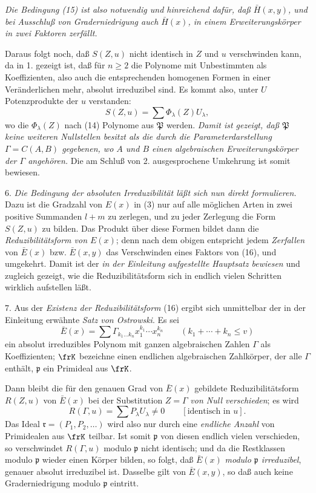 \emph{Die Bedingung (15) ist also notwendig und hinreichend dafür, daß $\bar H(x,y)$, und bei Ausschluß von Graderniedrigung auch $\bar H(x)$, in einem Erweiterungskörper in zwei Faktoren zerfällt.}

Daraus folgt noch, daß $S(Z,u)$ nicht identisch in $Z$ und $u$ verschwinden kann, da in 1. gezeigt ist, daß für $n\ge2$ die Polynome mit Unbestimmten als Koeffizienten, also auch die entsprechenden homogenen Formen in einer Veränderlichen mehr, absolut irreduzibel sind. Es kommt also, unter $U$ Potenzprodukte der $u$ verstanden:
\[
S(Z,u)=\sum \Phi_\lambda(Z)U_\lambda,
\]
wo die $\Phi_\lambda(Z)$ nach (14) Polynome aus $\mathfrak P$ werden. \emph{Damit ist gezeigt, daß $\mathfrak P$ keine weiteren Nullstellen besitzt als die durch die Parameterdarstellung $\Gamma=C(A,B)$ gegebenen, wo $A$ und $B$ einen algebraischen Erweiterungskörper der $\Gamma$ angehören.} Die am Schluß von 2. ausgesprochene Umkehrung ist somit bewiesen.

6. \emph{Die Bedingung der absoluten Irreduzibilität läßt sich nun direkt formulieren.} Dazu ist die Gradzahl von $E(x)$ in (3) nur auf alle möglichen Arten in zwei positive Summanden $l+m$ zu zerlegen, und zu jeder Zerlegung die Form $S(Z,u)$ zu bilden. Das Produkt über diese Formen
bildet dann die \emph{Reduzibilitätsform von $E(x)$}; denn nach dem obigen entspricht jedem \emph{Zerfallen} von $\bar E(x)$ bzw. $\bar E(x,y)$ das Verschwinden eines Faktors von (16), und umgekehrt. Damit ist der \emph{in der Einleitung aufgestellte Hauptsatz bewiesen} und zugleich gezeigt, wie die Reduzibilitätsform sich in endlich vielen Schritten wirklich aufstellen läßt.

7. Aus der \emph{Existenz der Reduzibilitätsform} (16) ergibt sich unmittelbar der in der Einleitung erwähnte \emph{Satz von Ostrowski}. Es sei
\[
 \bar E(x)=\sum \Gamma_{k_1\ldots k_n}x_1^{k_1}\cdots x_n^{k_n}
 \qquad(k_1+\cdots+k_n\le v)
\]
ein absolut irreduzibles Polynom mit ganzen algebraischen Zahlen $\Gamma$ als Koeffizienten; $\frK$ bezeichne einen endlichen algebraischen Zahlkörper, der alle $\Gamma$ enthält, $\mathfrak p$ ein Primideal aus $\frK$.

Dann bleibt die für den genauen Grad von $\bar E(x)$ gebildete Reduzibilitätsform $R(Z,u)$ von $\bar E(x)$ bei der Substitution $Z=\Gamma$ \emph{von Null verschieden}; es wird
\[
 R(\Gamma,u)=\sum P_\lambda U_\lambda\ne0\qquad[\text{identisch in }u].
\]
Das Ideal $\mathfrak r=(P_1,P_2,\ldots)$ wird also nur durch eine \emph{endliche Anzahl} von Primidealen aus $\frK$ teilbar. Ist somit $\mathfrak p$ von diesen endlich vielen verschieden, so verschwindet $R(\Gamma,u)$ modulo $\mathfrak p$ nicht identisch; und da die Restklassen modulo $\mathfrak p$ wieder einen Körper bilden, so folgt, daß $\bar E(x)$ \emph{modulo $\mathfrak p$ irreduzibel}, genauer absolut irreduzibel ist. Dasselbe gilt von $\bar E(x,y)$, so daß auch keine Graderniedrigung modulo $\mathfrak p$ eintritt.

